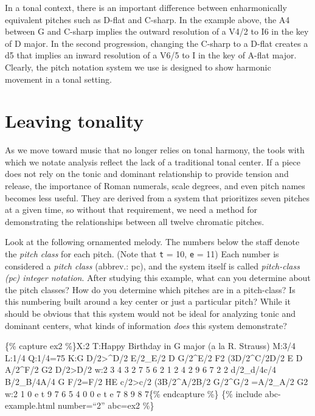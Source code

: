 \documentclass{book}
\begin{document}
In a tonal context, there is an important difference between enharmonically
equivalent pitches such as D-flat and C-sharp. In the example above, the A4
between G and C-sharp implies the outward resolution of a V4/2 to I6 in the
key of D major. In the second progression, changing the C-sharp to a D-flat
creates a d5 that implies an inward resolution of a V6/5 to I in the key of
A-flat major. Clearly, the pitch notation system we use is designed to show
harmonic movement in a tonal setting.

\hypertarget{leaving-tonality}{%
\section{Leaving tonality}\label{leaving-tonality}}

As we move toward music that no longer relies on tonal harmony, the tools with
which we notate analysis reflect the lack of a traditional tonal center. If a
piece does not rely on the tonic and dominant relationship to provide tension
and release, the importance of Roman numerals, scale degrees, and even pitch
names becomes less useful. They are derived from a system that prioritizes
seven pitches at a given time, so without that requirement, we need a method
for demonstrating the relationships between all twelve chromatic pitches.

Look at the following ornamented melody. The numbers below the staff denote
the \emph{pitch class} for each pitch. (Note that \texttt{t} = 10, \texttt{e}
= 11) Each number is considered a \emph{pitch class} (abbrev.: pc), and the
system itself is called \emph{pitch-class (pc) integer notation}. After
studying this example, what can you determine about the pitch classes? How do
you determine which pitches are in a pitch-class? Is this numbering built
around a key center or just a particular pitch? While it should be obvious
that this system would not be ideal for analyzing tonic and dominant centers,
what kinds of information \emph{does} this system demonstrate?

\{\% capture ex2 \%\}X:2 T:Happy Birthday in G major (a la R. Strauss) M:3/4
L:1/4 Q:1/4=75 K:G D/2\textgreater\^{}D/2\textbar{} E/2\_E/2 D
G/2\^{}E/2\textbar{} F2 (3D/2\^{}C/2D/2\textbar{} E D A/2\^{}F/2\textbar{} G2
D/2\textgreater D/2\textbar{} w:2 3 4 3 2 7 5 6 2 1 2 4 2 9 6 7 2 2
d/2\_d/4c/4 B/2\_B/4A/4 G\textbar{} F/2=F/2 HE c/2\textgreater c/2\textbar{}
(3B/2\^{}A/2B/2 G/2\^{}G/2 =A/2\_A/2\textbar{} G2\textbar{]} w:2 1 0 e t 9 7 6
5 4 0 0 e t e 7 8 9 8 7\{\% endcapture \%\} \{\% include abc-example.html
number=``2'' abc=ex2 \%\}
\end{document}
